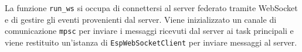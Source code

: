 La funzione \texttt{run\_ws} si occupa di connettersi al server federato tramite WebSocket e di gestire gli eventi provenienti dal server.
Viene inizializzato un canale di comunicazione \texttt{mpsc} per inviare i messaggi ricevuti dal server ai task principali e viene restituito un'istanza di \texttt{EspWebSocketClient} per 
inviare messaggi al server.